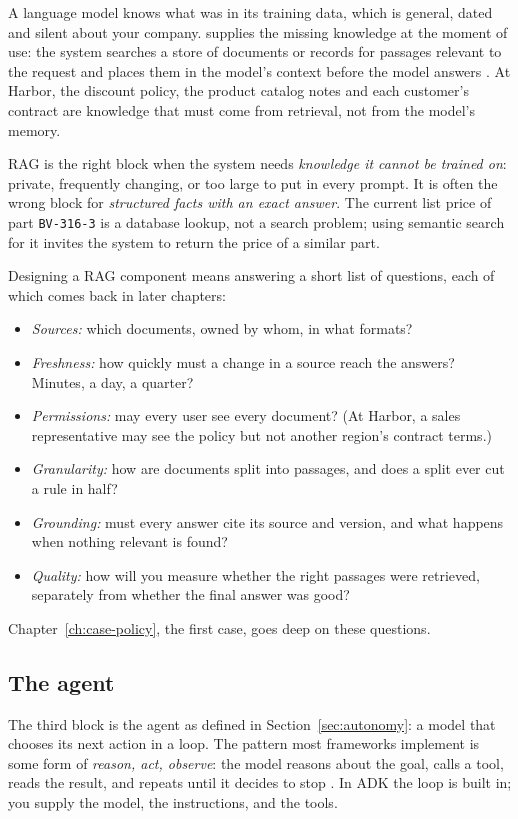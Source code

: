 A language model knows what was in its training data, which is general, dated and silent about your company.  supplies the missing knowledge at the moment of use: the system searches a store of documents or records for passages relevant to the request and places them in the model's context before the model answers \citep{lewis2020rag}. At Harbor, the discount policy, the product catalog notes and each customer's contract are knowledge that must come from retrieval, not from the model's memory.

RAG is the right block when the system needs \emph{knowledge it cannot be trained on}: private, frequently changing, or too large to put in every prompt. It is often the wrong block for \emph{structured facts with an exact answer}. The current list price of part \texttt{BV-316-3} is a database lookup, not a search problem; using semantic search for it invites the system to return the price of a similar part.

Designing a RAG component means answering a short list of questions, each of which comes back in later chapters:
\begin{itemize}[itemsep=1pt]
  \item \emph{Sources:} which documents, owned by whom, in what formats?
  \item \emph{Freshness:} how quickly must a change in a source reach the answers? Minutes, a day, a quarter?
  \item \emph{Permissions:} may every user see every document? (At Harbor, a sales representative may see the policy but not another region's contract terms.)
  \item \emph{Granularity:} how are documents split into passages, and does a split ever cut a rule in half?
  \item \emph{Grounding:} must every answer cite its source and version, and what happens when nothing relevant is found?
  \item \emph{Quality:} how will you measure whether the right passages were retrieved, separately from whether the final answer was good?
\end{itemize}
Chapter~\ref{ch:case-policy}, the first case, goes deep on these questions.

\subsection{The agent}
\label{sec:block-agent}

The third block is the agent as defined in Section~\ref{sec:autonomy}: a model that chooses its next action in a loop. The pattern most frameworks implement is some form of \emph{reason, act, observe}: the model reasons about the goal, calls a tool, reads the result, and repeats until it decides to stop \citep{yao2023react}. In ADK the loop is built in; you supply the model, the instructions, and the tools.

